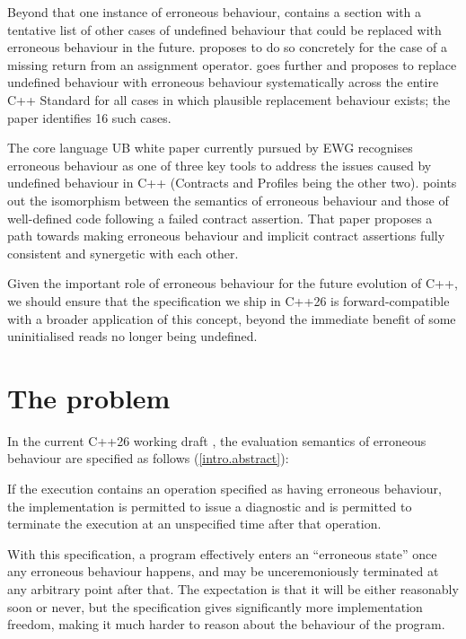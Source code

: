 Beyond that one instance of erroneous behaviour, \cite{P2795R5} contains a section with a tentative list of other cases of undefined behaviour that could be replaced with erroneous behaviour in the future. \cite{P2973R0} proposes to do so concretely for the case of a missing return from an assignment operator. \cite{P3100R4} goes further and proposes to replace undefined behaviour with erroneous behaviour systematically across the entire C++ Standard for all cases in which plausible replacement behaviour exists; the paper identifies 16 such cases.

The core language UB white paper \cite{P3656R1} currently pursued by EWG recognises erroneous behaviour as one of three key tools to address the issues caused by undefined behaviour in C++ (Contracts and Profiles being the other two). \cite{P3229R0} points out the isomorphism between the semantics of erroneous behaviour and those of well-defined code following a failed contract assertion. That paper proposes a path towards making erroneous behaviour and implicit contract assertions fully consistent and synergetic with each other.

Given the important role of erroneous behaviour for the future evolution of C++, we should ensure that the specification we ship in C++26 is forward-compatible with a broader application of this concept, beyond the immediate benefit of some uninitialised reads no longer being undefined.

\section{The problem}

In the current C++26 working draft \cite{N5014}, the evaluation semantics of erroneous behaviour are specified as follows (\href{https://eel.is/c++draft/intro.abstract#6.sentence-5}{[intro.abstract]}):
\begin{adjustwidth}{0.5cm}{0.5cm}
If the execution contains an operation specified as having erroneous behaviour, the implementation is permitted to issue a diagnostic and is permitted to terminate the execution at an unspecified time after that operation.
\end{adjustwidth} 
With this specification, a program effectively enters an ``erroneous state'' once any erroneous behaviour happens, and may be unceremoniously terminated at any arbitrary point after that.  The expectation is that it will be either reasonably soon or never, but the specification gives significantly more implementation freedom, making it much harder to reason about the behaviour of the program.

